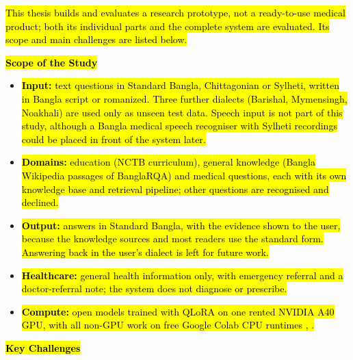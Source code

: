 \hl{This thesis builds and evaluates a research prototype, not a
ready-to-use medical product; both its individual parts and the complete
system are evaluated. Its scope and main challenges are listed below.}

\textbf{\hl{Scope of the Study}}

\begin{itemize}
\item \hl{\textbf{Input:} text questions in Standard Bangla, Chittagonian or
Sylheti, written in Bangla script or romanized. Three further dialects
(Barishal, Mymensingh, Noakhali) are used only as unseen test data.
Speech input is not part of this study, although a Bangla medical speech
recogniser with Sylheti recordings \cite{kabir2024asr} could be placed in front of
the system later.}

\item \hl{\textbf{Domains:} education (NCTB curriculum), general knowledge
(Bangla Wikipedia passages of BanglaRQA) and medical questions, each
with its own knowledge base and retrieval pipeline; other questions are
recognised and declined.}

\item \hl{\textbf{Output:} answers in Standard Bangla, with the evidence
shown to the user, because the knowledge sources and most readers use
the standard form. Answering back in the user's dialect is left for
future work.}

\item \hl{\textbf{Healthcare:} general health information only, with
emergency referral and a doctor-referral note; the system does not
diagnose or prescribe.}

\item \hl{\textbf{Compute:} open models trained with QLoRA on one rented
NVIDIA A40 GPU, with all non-GPU work on free Google Colab CPU runtimes
\cite{hu2022lora}, \cite{dettmers2023qlora}.}
\end{itemize}

\textbf{\hl{Key Challenges}}

